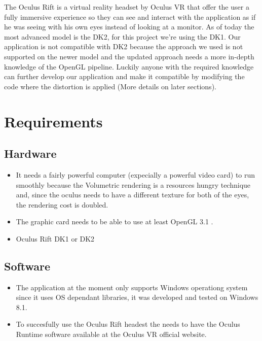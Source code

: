 \documentclass[11pt]{article} %
\begin{document}
The Oculus Rift  is a virtual reality headset by Oculus VR that offer the user a fully immersive experience so they can see and interact with the application as if he was seeing with his own eyes instead of looking at a monitor. As of today the most advanced model is the DK2, for this project we're using the DK1. Our application is not compatible with DK2 because the approach we used is not supported on the newer model and the updated approach needs a more in-depth knowledge of the OpenGL pipeline. Luckily anyone with the required knowledge can further develop our application and make it compatible by modifying the code where the distortion is applied (More details on later sections).









\newpage
\section{Requirements}

\subsection{Hardware}
\begin{itemize}
\item It needs a fairly powerful computer (expecially a powerful video card) to run smoothly because the Volumetric rendering is a resources hungry technique and, since the oculus needs to have a different texture for both of the eyes, the rendering cost is doubled.

\item The graphic card needs to be able to use at least OpenGL 3.1 .

\item Oculus Rift DK1 or DK2
\end{itemize}


\subsection{Software}
\begin{itemize}
\item The application at the moment only supports Windows operationg system since it uses OS dependant libraries, it was developed and tested on Windows 8.1.
\item To succesfully use the Oculus Rift headest the needs to have the Oculus Runtime software available at the Oculus VR official website.
\end{itemize}
\end{document}
